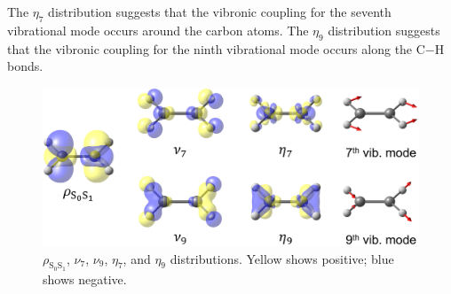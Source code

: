 ﻿\documentclass[11pt,a4paper,openany]{article}
\begin{document}
The $\eta_7$ distribution suggests that the vibronic coupling for the seventh vibrational mode occurs around the carbon atoms. 
The $\eta_9$ distribution suggests that the vibronic coupling for the ninth vibrational mode occurs along the C$-$H bonds.

\begin{figure}[t]
\centering
\includegraphics[width=15cm]{vcd.eps}
\caption{
$\rho_{\mathrm{S}_0\mathrm{S}_1}$, $\nu_7$, $\nu_9$, $\eta_7$, and $\eta_9$ distributions.
Yellow shows positive; blue shows negative.
}
\label{fig:vcd}
\end{figure}


\clearpage


\end{document}
